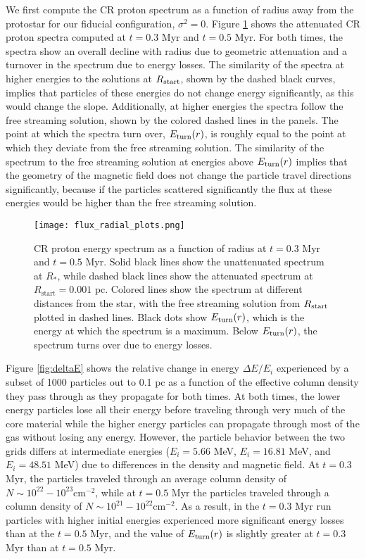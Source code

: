 \documentclass[twocolumn]{aastex63}
\def\t{\text}
\begin{document}
We first compute the CR proton spectrum as a function of radius away from the protostar for our fiducial configuration, $\sigma^2=0$. Figure \ref{fig:t_radial} shows the attenuated CR proton spectra computed at $t=0.3$ Myr and $t=0.5$ Myr. For both times, the spectra show an overall decline with radius due to geometric attenuation and a turnover in the spectrum due to energy losses. The similarity of the spectra at higher energies to the solutions at $R_{\rm start}$, shown by the dashed black curves, implies that particles of these energies do not change energy significantly, as this would change the slope. Additionally, at higher energies the spectra follow the free streaming solution, shown by the colored dashed lines in the panels. The point at which the spectra turn over, $E_{\rm turn} (r)$, is roughly equal to the point at which they deviate from the free streaming solution. The similarity of the spectrum to the free streaming solution at energies above $E_{\rm turn} (r)$ implies that the geometry of the magnetic field does not change the particle travel directions significantly, because if the particles scattered significantly the flux at these energies would be higher than the free streaming solution. 

\begin{figure*}
\centering
\texttt{[image: flux\_radial\_plots.png]} \caption{CR proton energy spectrum as a function of radius at $t=0.3$ Myr and $t=0.5$ Myr. Solid black lines show the unattenuated spectrum at $R_*$, while dashed black lines show the attenuated spectrum at $R_{\t{start}}=0.001$ pc. Colored lines show the spectrum at different distances from the star, with the free streaming solution from $R_{\rm start}$ plotted in dashed lines. Black dots show $E_{\rm turn} (r)$, which is the energy at which the spectrum is a maximum. Below $E_{\rm turn} (r)$, the spectrum turns over due to energy losses.}
\label{fig:t_radial}
\end{figure*}

Figure \ref{fig:deltaE} shows the relative change in energy $\Delta E /E_i$ experienced by a subset of 1000 particles out to 0.1 pc as a function of the effective column density they pass through as they propagate for both times. At both times, the lower energy particles lose all their energy before traveling through very much of the core material while the higher energy particles can propagate through most of the gas without losing any energy. However, the particle behavior between the two grids differs at intermediate energies ($E_i=5.66$ MeV, $E_i=16.81$ MeV, and $E_i=48.51$ MeV) due to differences in the density and magnetic field. At $t=0.3$ Myr, the particles traveled through an average column density of $N \sim 10^{22}-10^{23} \t{cm}^{-2}$, while at $t=0.5$ Myr the particles traveled through a column density of $N \sim 10^{21}-10^{22} \t{cm}^{-2}$. As a result, in the $t=0.3$ Myr run particles with higher initial energies experienced more significant energy losses than at the $t=0.5$ Myr, and the value of $E_{\rm turn} (r)$ is slightly greater at $t=0.3$ Myr than at $t=0.5$ Myr.
\end{document}
